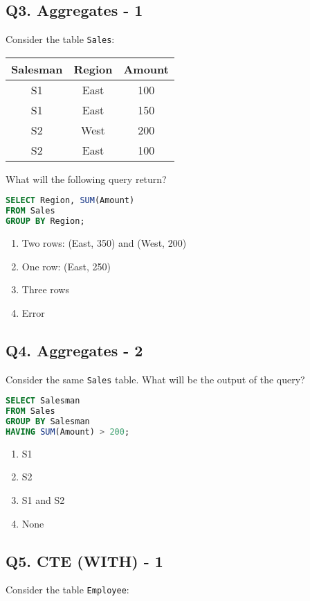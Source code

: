 \subsection*{Q3. Aggregates - 1}
Consider the table \texttt{Sales}:
\vspace{0.4cm}
\begin{tabular}{|c|c|c|}
\hline
\textbf{Salesman} & \textbf{Region} & \textbf{Amount} \\
\hline
S1 & East & 100 \\
S1 & East & 150 \\
S2 & West & 200 \\
S2 & East & 100 \\
\hline
\end{tabular}

What will the following query return?

\begin{lstlisting}[language=SQL]
SELECT Region, SUM(Amount) 
FROM Sales 
GROUP BY Region;
\end{lstlisting}

\begin{enumerate}[label=(\alph*)]
    \item Two rows: (East, 350) and (West, 200)
    \item One row: (East, 250)
    \item Three rows
    \item Error
\end{enumerate}

\subsection*{Q4. Aggregates - 2}
Consider the same \texttt{Sales} table. What will be the output of the query?

\begin{lstlisting}[language=SQL]
SELECT Salesman 
FROM Sales 
GROUP BY Salesman 
HAVING SUM(Amount) > 200;
\end{lstlisting}

\begin{enumerate}[label=(\alph*)]
    \item S1
    \item S2
    \item S1 and S2
    \item None
\end{enumerate}

\subsection*{Q5. CTE (WITH) - 1}
Consider the table \texttt{Employee}:

